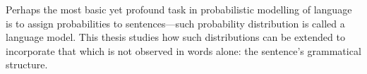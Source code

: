 %

Perhaps the most basic yet profound task in probabilistic modelling of language is to assign probabilities to sentences---such probability distribution is called a language model. This thesis studies how such distributions can be extended to incorporate that which is not observed in words alone: the sentence's grammatical structure.

